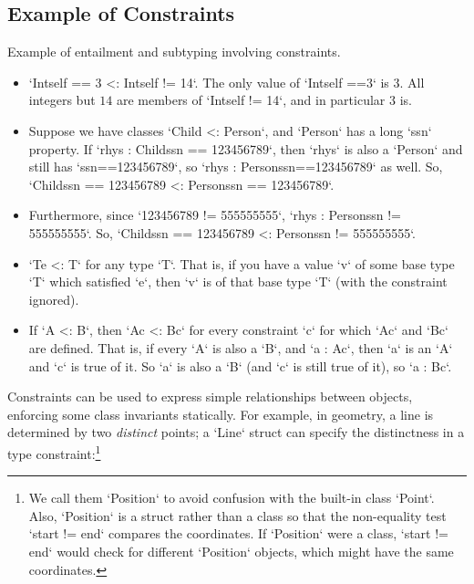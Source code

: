 \subsection{Example of Constraints}
\label{ConstraintExamples}

Example of entailment and subtyping involving constraints.
\begin{itemize}
\item \xcd`Int{self == 3} <: Int{self != 14}`.  The only value of
      \xcd`Int{self ==3}` is $3$.  All integers but $14$ are members of
      \xcd`Int{self != 14}`, and in particular $3$ is.  
\item Suppose we have classes \xcd`Child <: Person`, and \xcd`Person` has a
      long \xcd`ssn` property.  If \xcd`rhys : Child{ssn == 123456789}`, then
      \xcd`rhys` is also a \xcd`Person` and still has \xcd`ssn==123456789`, so 
      \xcd`rhys : Person{ssn==123456789}` as well.  
      So, \xcd`Child{ssn == 123456789} <: Person{ssn == 123456789}`.
\item Furthermore, since \xcd`123456789 != 555555555`, 
      \xcd`rhys : Person{ssn != 555555555}`.  
      So, \xcd`Child{ssn == 123456789} <: Person{ssn != 555555555}`.  
\item \xcd`T{e} <: T` for any type \xcd`T`.  That is, if you have a value
      \xcd`v` of some base type \xcd`T` which satisfied \xcd`e`, then \xcd`v`
      is of that base type \xcd`T` (with the constraint ignored).
\item If \xcd`A <: B`, then \xcd`A{c} <: B{c}` for every constraint \xcd`{c}`
      for which \xcd`A{c}` and \xcd`B{c}` are defined.  That is, if every
      \xcd`A` is also a \xcd`B`, and \xcd`a : A{c}`, then 
      \xcd`a` is an \xcd`A` and \xcd`c` is true of it. So \xcd`a` is also a
      \xcd`B` (and \xcd`c` is still true of 
      it), so \xcd`a : B{c}`.  
\end{itemize}

Constraints can be used to express simple relationships between objects,
enforcing some class invariants statically.  For example, in geometry, a line
is determined by two {\em distinct} points; a \xcd`Line` struct can specify the
distinctness in a type constraint:\footnote{We call them
\xcd`Position` to avoid confusion with the built-in class \xcd`Point`. 
Also, \xcd`Position` is a struct rather than a class so that the non-equality
test \xcd`start != end` compares the coordinates.  If \xcd`Position` were a
class, \xcd`start != end` would check for different \xcd`Position` objects,
which might have the same coordinates.
}


